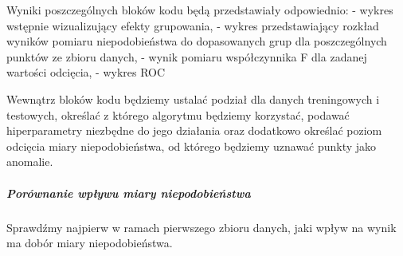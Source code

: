 \documentclass[
]{article}
\newenvironment{Shaded}{\begin{snugshade}}{\end{snugshade}}
\newcommand{\DataTypeTok}[1]{\textcolor[rgb]{0.13,0.29,0.53}{#1}}
\newcommand{\KeywordTok}[1]{\textcolor[rgb]{0.13,0.29,0.53}{\textbf{#1}}}
\newcommand{\NormalTok}[1]{#1}
\newcommand{\OperatorTok}[1]{\textcolor[rgb]{0.81,0.36,0.00}{\textbf{#1}}}
\newcommand{\OtherTok}[1]{\textcolor[rgb]{0.56,0.35,0.01}{#1}}
\newcommand{\StringTok}[1]{\textcolor[rgb]{0.31,0.60,0.02}{#1}}
\begin{document}
\begin{Shaded}
\end{Shaded}

Wyniki poszczególnych bloków kodu będą przedstawiały odpowiednio: -
wykres wstępnie wizualizujący efekty grupowania, - wykres
przedstawiający rozkład wyników pomiaru niepodobieństwa do dopasowanych
grup dla poszczególnych punktów ze zbioru danych, - wynik pomiaru
współczynnika F dla zadanej wartości odcięcia, - wykres ROC

Wewnątrz bloków kodu będziemy ustalać podział dla danych treningowych i
testowych, określać z którego algorytmu będziemy korzystać, podawać
hiperparametry niezbędne do jego działania oraz dodatkowo określać
poziom odcięcia miary niepodobieństwa, od którego będziemy uznawać
punkty jako anomalie.

\hypertarget{poruxf3wnanie-wpux142ywu-miary-niepodobieux144stwa}{%
\subparagraph{Porównanie wpływu miary
niepodobieństwa}\label{poruxf3wnanie-wpux142ywu-miary-niepodobieux144stwa}}

Sprawdźmy najpierw w ramach pierwszego zbioru danych, jaki wpływ na
wynik ma dobór miary niepodobieństwa.
\end{document}
